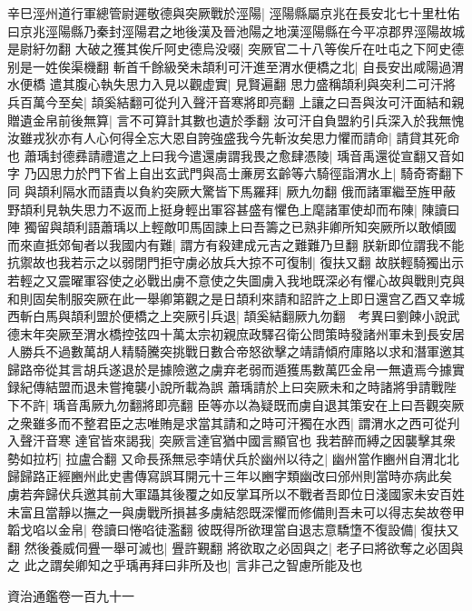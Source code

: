 辛巳涇州道行軍總管尉遲敬德與突厥戰於涇陽|{
	涇陽縣屬京兆在長安北七十里杜佑曰京兆涇陽縣乃秦封涇陽君之地後漢及晉池陽之地漢涇陽縣在今平凉郡界涇陽故城是尉紆勿翻}
大破之獲其俟斤阿史德烏没啜|{
	突厥官二十八等俟斤在吐屯之下阿史德别是一姓俟渠機翻}
斬首千餘級癸未頡利可汗進至渭水便橋之北|{
	自長安出咸陽過渭水便橋}
遣其腹心執失思力入見以觀虚實|{
	見賢遍翻}
思力盛稱頡利與突利二可汗將兵百萬今至矣|{
	頡奚結翻可從刋入聲汗音寒將即亮翻}
上讓之曰吾與汝可汗面結和親贈遺金帛前後無算|{
	言不可算計其數也遺於季翻}
汝可汗自負盟約引兵深入於我無愧汝雖戎狄亦有人心何得全忘大恩自誇強盛我今先斬汝矣思力懼而請命|{
	請貸其死命也}
蕭瑀封德彞請禮遣之上曰我今遣還虜謂我畏之愈肆憑陵|{
	瑀音禹還從宣翻又音如字}
乃囚思力於門下省上自出玄武門與高士亷房玄齡等六騎徑詣渭水上|{
	騎奇寄翻下同}
與頡利隔水而語責以負約突厥大驚皆下馬羅拜|{
	厥九勿翻}
俄而諸軍繼至旌甲蔽野頡利見執失思力不返而上挺身輕出軍容甚盛有懼色上麾諸軍使却而布陳|{
	陳讀曰陣}
獨留與頡利語蕭瑀以上輕敵叩馬固諫上曰吾籌之已熟非卿所知突厥所以敢傾國而來直抵郊甸者以我國内有難|{
	謂方有殺建成元吉之難難乃旦翻}
朕新即位謂我不能抗禦故也我若示之以弱閉門拒守虜必放兵大掠不可復制|{
	復扶又翻}
故朕輕騎獨出示若輕之又震曜軍容使之必戰出虜不意使之失圖虜入我地既深必有懼心故與戰則克與和則固矣制服突厥在此一舉卿第觀之是日頡利來請和詔許之上即日還宫乙酉又幸城西斬白馬與頡利盟於便橋之上突厥引兵退|{
	頡奚結翻厥九勿翻　考異曰劉餗小說武德末年突厥至渭水橋控弦四十萬太宗初親庶政驛召衛公問策時發諸州軍未到長安居人勝兵不過數萬胡人精騎騰突挑戰日數合帝怒欲擊之靖請傾府庫賂以求和潛軍邀其歸路帝從其言胡兵遂退於是據險邀之虜弃老弱而遁獲馬數萬匹金帛一無遺焉今據實録紀傳結盟而退未嘗掩襲小說所載為誤}
蕭瑀請於上曰突厥未和之時諸將爭請戰陛下不許|{
	瑀音禹厥九勿翻將即亮翻}
臣等亦以為疑既而虜自退其策安在上曰吾觀突厥之衆雖多而不整君臣之志唯賄是求當其請和之時可汗獨在水西|{
	謂渭水之西可從刋入聲汗音寒}
達官皆來謁我|{
	突厥言達官猶中國言顯官也}
我若醉而縛之因襲擊其衆勢如拉朽|{
	拉盧合翻}
又命長孫無忌李靖伏兵於幽州以待之|{
	幽州當作豳州自渭北北歸歸路正經豳州此史書傳寫誤耳開元十三年以豳字類幽改曰邠州則當時亦病此矣}
虜若奔歸伏兵邀其前大軍躡其後覆之如反掌耳所以不戰者吾即位日淺國家未安百姓未富且當靜以撫之一與虜戰所損甚多虜結怨既深懼而修備則吾未可以得志矣故卷甲韜戈啗以金帛|{
	卷讀曰惓啗徒濫翻}
彼既得所欲理當自退志意驕墯不復設備|{
	復扶又翻}
然後養威伺舋一舉可滅也|{
	舋許覲翻}
將欲取之必固與之|{
	老子曰將欲奪之必固與之}
此之謂矣卿知之乎瑀再拜曰非所及也|{
	言非己之智慮所能及也}


資治通鑑卷一百九十一
